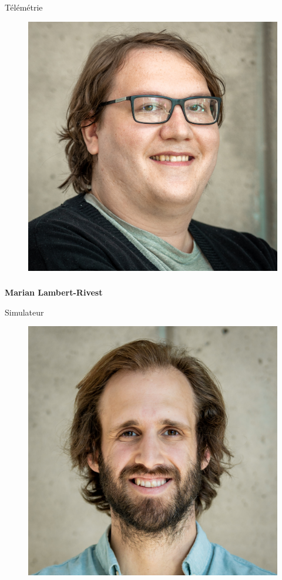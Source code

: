 \documentclass[a0paper,portrait]{baposter}
\begin{document}
\begin{poster}
{Télémétrie
\begin{figure}
\includegraphics[width=.9\linewidth]{img/membres/Marian-Lambert-Rivest-3.jpg} 
\end{figure}
\subsubsection*{}
\vspace{2mm}
\textbf{Marian Lambert-Rivest}


Simulateur
\begin{figure}
\includegraphics[width=.9\linewidth]{img/membres/Mathieu-Parent-2.jpg} 
\end{figure}
}
\end{poster}
\end{document}
